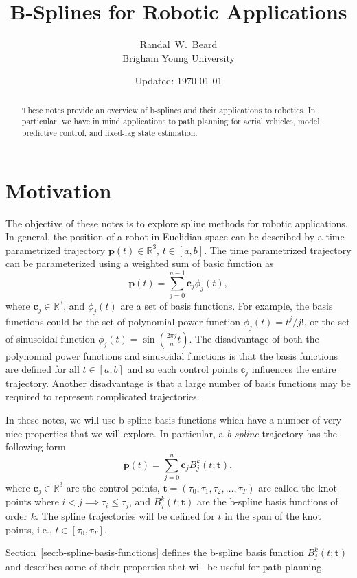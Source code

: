 \documentclass{article}
\title{\LARGE \bf
B-Splines for Robotic Applications
}
\date{Updated: \today}
\author{Randal~W.~Beard \\ Brigham Young University}
\begin{document}
\maketitle

\begin{abstract}
These notes provide an overview of b-splines and their applications to robotics.  In particular, we have in mind applications to path planning for aerial vehicles, model predictive control, and fixed-lag state estimation.  
\end{abstract}

\section{Motivation}

The objective of these notes is to explore spline methods for robotic applications. In general, the position of a robot in Euclidian space can be described by a time parametrized trajectory $\mathbf{p}(t)\in\mathbb{R}^3$, $t\in[a,b]$.  The time parametrized trajectory can be parameterized using a weighted sum of basic function as
\[
\mathbf{p}(t) = \sum_{j=0}^{n-1} \mathbf{c}_j \phi_j(t),
\]
where $\mathbf{c}_j\in\mathbb{R}^3$, and $\phi_j(t)$ are a set of basis functions.  For example, the basis functions could be the set of polynomial power function $\phi_j(t) = t^j/j!$, or the set of sinusoidal function $\phi_j(t) = \sin(\frac{2\pi j}{n}t)$.  The disadvantage of both the polynomial power functions and sinusoidal functions is that the basis functions are defined for all $t\in[a,b]$ and so each control points $\mathbb{c}_j$ influences the entire trajectory.  Another disadvantage is that a large number of basis functions may be required to represent complicated trajectories.  

In these notes, we will use b-spline basis functions which have a number of very nice properties that we will explore.  In particular, a {\em b-spline} trajectory has the following form
\[
\mathbf{p}(t) = \sum_{j=0}^{n} \mathbf{c}_j B_j^k(t;\mathbf{t}),
\]
where $\mathbf{c}_j\in\mathbb{R}^3$ are the control points,  $\mathbf{t}=(\tau_0, \tau_1, \tau_2, \dots, \tau_T)$ are called the knot points where $i<j \implies \tau_i\leq \tau_j$, and $B_j^k(t;\mathbf{t})$ are the b-spline basis functions of order $k$. The spline trajectories will be defined for $t$ in the span of the knot points, i.e., $t\in[\tau_0, \tau_T]$.  

Section~\ref{sec:b-spline-basis-functions} defines the b-spline basis function $B_j^k(t; \mathbf{t})$ and describes some of their properties that will be useful for path planning.
\end{document}
